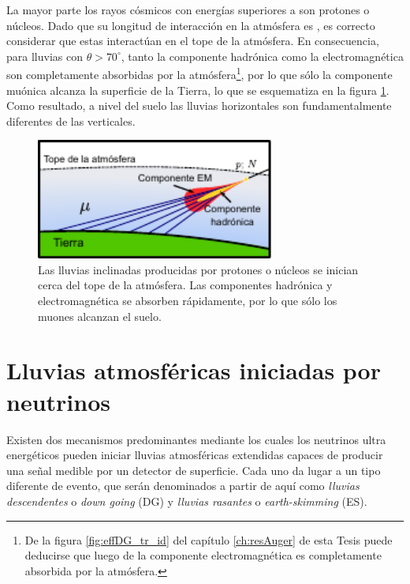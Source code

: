 La mayor parte los rayos cósmicos con energías superiores a  son protones o n\'ucleos.
Dado que su longitud de interacción en la atmósfera es , es correcto considerar que estas interact\'uan en el tope de la atmósfera.
En consecuencia, para lluvias con $\theta>70^\circ$, tanto la componente hadrónica como la electromagnética son completamente absorbidas por la atmósfera\footnote{De la figura \ref{fig:effDG_tr_id} del cap\'itulo \ref{ch:resAuger} de esta Tesis puede deducirse que luego de  la componente electromagn\'etica es completamente absorbida por la atm\'osfera.}, por lo que sólo la componente muónica alcanza la superficie de la Tierra, lo que se esquematiza en la figura \ref{fig:horizontalHad}.
Como resultado, a nivel del suelo las lluvias horizontales son fundamentalmente diferentes de las verticales.
%
\begin{figure}[h!]
\begin{center}
\includegraphics[width=0.7\textwidth]{fig/EASAuger/horizontal2_english.pdf}
\caption{Las lluvias inclinadas producidas por protones o n\'ucleos se inician cerca del tope de la atmósfera.
Las componentes hadrónica y electromagnética se absorben rápidamente, por lo que sólo los muones alcanzan el suelo.
}
\label{fig:horizontalHad}
\end{center}
\end{figure}

\section{Lluvias atmosf\'ericas iniciadas por neutrinos}
\label{sc:easNu}

Existen dos mecanismos predominantes mediante los cuales los neutrinos ultra energ\'eticos pueden iniciar lluvias atmosféricas extendidas capaces de producir una se\~nal medible por un detector de superficie.
Cada uno da lugar a un tipo diferente de evento, que ser\'an denominados a partir de aqu\'i como \emph{lluvias descendentes} o \emph{down going} (DG) y \emph{lluvias rasantes} o \emph{earth-skimming} (ES).

